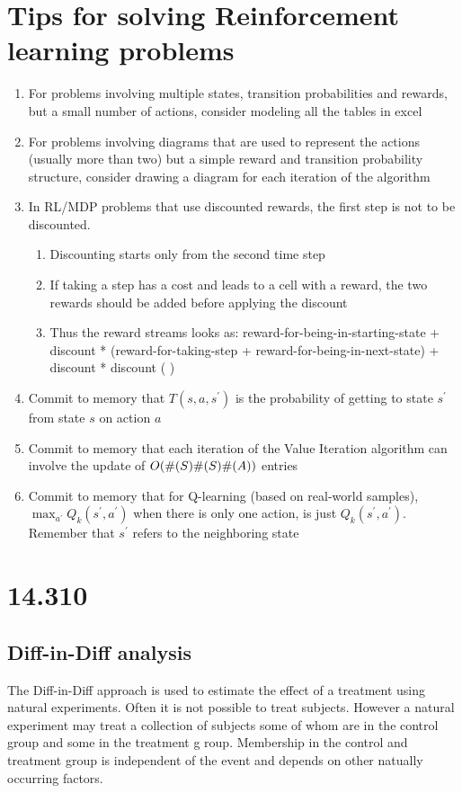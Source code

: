\section {Tips for solving Reinforcement learning problems}
\begin {enumerate}
\item For problems involving multiple states, transition probabilities and rewards, but a small number of actions, consider modeling all the tables in excel
\item For problems involving diagrams that are used to represent the actions (usually more than two) but a simple reward and transition probability structure, consider drawing a diagram for each iteration of the algorithm
\item In RL/MDP problems that use discounted rewards, the first step is not to be discounted.
  \begin {enumerate}
  \item Discounting starts only from the second time step
  \item If taking a step has a cost and leads to a cell with a reward, the two rewards should be added before applying the discount
  \item Thus the reward streams looks as: reward-for-being-in-starting-state + discount * (reward-for-taking-step + reward-for-being-in-next-state) + discount * discount ( )
  \end {enumerate}
\item Commit to memory that $T(s, a, s^{'})$ is the probability of getting to state $s^{'}$ from state $s$ on action $a$
\item Commit to memory that each iteration of the Value Iteration algorithm can involve the update of $O(\mathrm{\#}(S) \mathrm{\#}(S) \mathrm{\#}(A))$ entries
\item Commit to memory that for Q-learning (based on real-world samples), $\max_{a^{'}} Q_k(s^{'}, a^{'})$ when there is only one action, is just $Q_k(s^{'}, a^{'})$. Remember that $s^{'}$ refers to the neighboring state
\end {enumerate}

\section {14.310}
\subsection {Diff-in-Diff analysis}
The Diff-in-Diff approach is used to estimate the effect of a treatment using natural experiments. Often it is not possible to treat subjects. However a natural experiment may treat a collection of subjects some of whom are in the control group and some in the treatment g
roup. Membership in the control and treatment group is independent of the event and depends on other natually occurring factors.

